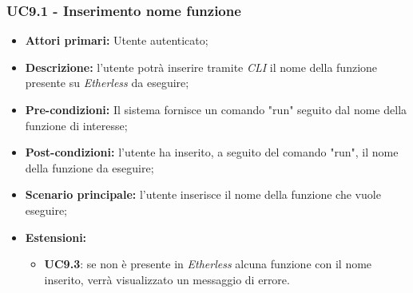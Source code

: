 \subsubsection{UC9.1 - Inserimento nome funzione}
\begin{itemize}
	\item \textbf{Attori primari:} Utente autenticato;
	\item \textbf{Descrizione:} l'utente potrà inserire tramite \textit{CLI\glo} il nome della funzione presente su \textit{Etherless} da eseguire; 
	\item \textbf{Pre-condizioni:} Il sistema fornisce un comando "run" seguito dal nome della funzione di interesse;
	\item \textbf{Post-condizioni:} l'utente ha inserito, a seguito del comando "run", il nome della funzione da eseguire;
	\item \textbf{Scenario principale:} l'utente inserisce il nome della funzione che vuole eseguire;
	\item \textbf{Estensioni:} 
	\begin{itemize}
		\item \textbf{UC9.3}: se non è presente in \textit{Etherless} alcuna funzione con il nome inserito, verrà visualizzato un messaggio di errore.
	\end{itemize}
\end{itemize}